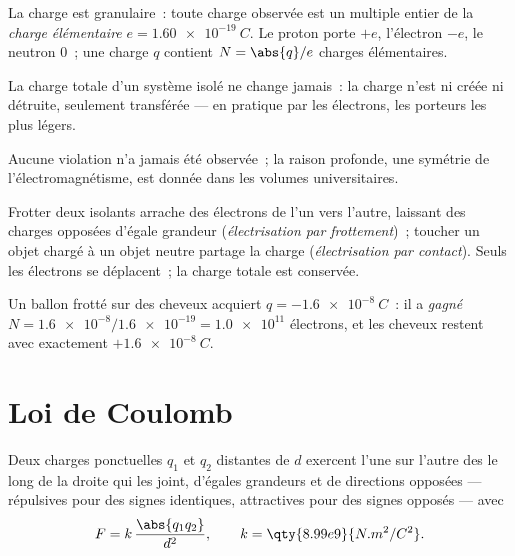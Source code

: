 \begin{definition}\label{def:g11:fundamental-interactions:elementary}
La charge est granulaire~: toute charge observée est un multiple entier
de la \emph{charge élémentaire}
$e = \qty{1.60e-19}{C}$. Le proton porte $+e$, l'électron $-e$, le
neutron $0$~; une charge $q$ contient $N = \abs{q}/e$ charges
élémentaires.
\end{definition}

\begin{proposition}\label{prop:g11:fundamental-interactions:conservation}
La charge totale d'un système isolé ne change jamais~: la charge n'est
ni créée ni détruite, seulement transférée --- en pratique par les
électrons, les porteurs les plus légers.
\end{proposition}
\admitted

\begin{remark}\label{rem:g11:fundamental-interactions:conservation}
Aucune violation n'a jamais été observée~; la raison profonde, une
symétrie de l'électromagnétisme, est donnée dans les volumes
universitaires.
\end{remark}

\begin{definition}\label{def:g11:fundamental-interactions:charging}
Frotter deux isolants arrache des électrons de l'un vers l'autre, laissant
des charges opposées d'égale grandeur (\emph{électrisation par
frottement})~; toucher un objet
chargé à un objet neutre partage la charge (\emph{électrisation par
contact}). Seuls les électrons se
déplacent~; la charge totale est conservée.
\end{definition}

\begin{example}\label{ex:g11:fundamental-interactions:balloon}
Un ballon frotté sur des cheveux acquiert $q = \qty{-1.6e-8}{C}$~: il a
\emph{gagné} $N = \num{1.6e-8} / \num{1.6e-19} = \num{1.0e11}$
électrons, et les cheveux restent avec exactement $+\qty{1.6e-8}{C}$.
\end{example}

\section{Loi de Coulomb}

\begin{theorem}\label{thm:g11:fundamental-interactions:coulomb}
Deux charges ponctuelles $q_1$ et $q_2$ distantes de $d$ exercent l'une
sur l'autre des  le long de la droite qui
les joint, d'égales grandeurs et de directions opposées ---
répulsives pour des signes identiques, attractives pour des signes
opposés --- avec
\[
F = k\,\frac{\abs{q_1 q_2}}{d^{2}},
\qquad k = \qty{8.99e9}{N.m^2/C^2}.
\]
\end{theorem}
\admitted

